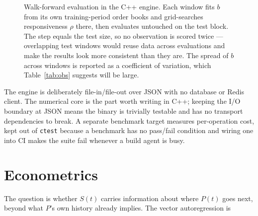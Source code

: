 \documentclass[11pt]{article}
\newcommand{\code}[1]{\texttt{\small #1}}
\begin{document}
\begin{figure}[htbp]
\centering
{}
\caption[Walk-forward evaluation windows]{Walk-forward evaluation in the C++ engine. Each window fits $b$ from its
own training-period order books and grid-searches responsiveness $\rho$ there,
then evaluates untouched on the test block. The step equals the test size, so no
observation is scored twice --- overlapping test windows would reuse data across
evaluations and make the results look more consistent than they are. The spread
of $b$ across windows is reported as a coefficient of variation, which
Table~\ref{tab:obs} suggests will be large.}
\label{fig:walkforward}
\end{figure}

The engine is deliberately file-in/file-out over JSON with no database or Redis
client. The numerical core is the part worth writing in C++; keeping the I/O
boundary at JSON means the binary is trivially testable and has no transport
dependencies to break. A separate benchmark target measures per-operation cost,
kept out of \code{ctest} because a benchmark has no pass/fail condition and
wiring one into CI makes the suite fail whenever a build agent is busy.

\section{Econometrics}
\label{sec:econ}

The question is whether $S(t)$ carries information about where $P(t)$ goes next,
beyond what $P$'s own history already implies. The vector autoregression is
\end{document}
